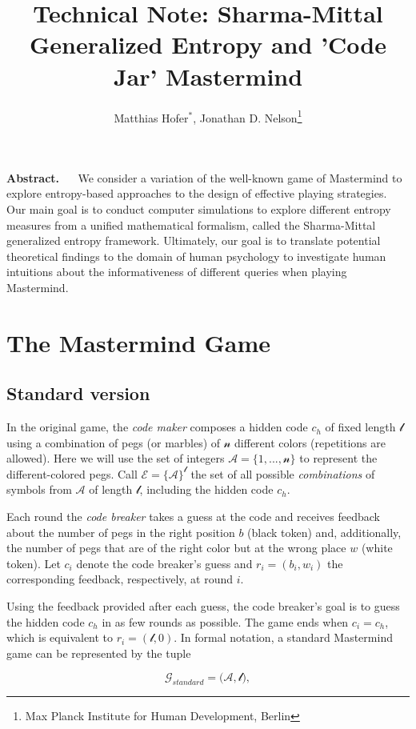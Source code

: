 \documentclass[12pt]{article}
\title{Technical Note: Sharma-Mittal Generalized Entropy and 'Code Jar' Mastermind}
\author{Matthias Hofer$^*$, Jonathan D. Nelson\footnote{Max Planck Institute for Human Development, Berlin}}
\begin{document}
\maketitle

{\footnotesize \textbf{Abstract.} $\quad$ We consider a variation of the well-known game of Mastermind to explore entropy-based approaches to the design of effective playing strategies. Our main goal is to conduct computer simulations to explore different entropy measures from a unified mathematical formalism, called the Sharma-Mittal generalized entropy framework. Ultimately, our goal is to translate potential theoretical findings to the domain of human psychology to investigate human intuitions about the informativeness of different queries when playing Mastermind.}

\tableofcontents

\pagebreak
\section{The Mastermind Game}
\subsection{Standard version}
In the original game, the \textit{code maker} composes a hidden code $c_h$ of fixed length $\mathcal{l}$ using a combination of pegs (or marbles) of $\mathcal{n}$ different colors (repetitions are allowed). Here we will use the set of integers $\mathcal{A} = \{1, ..., \mathcal{n}\}$ to represent the different-colored pegs. Call $\mathcal{E} = \{\mathcal{A}\}^\mathcal{l}$ the set of all possible \textit{combinations} of symbols from $\mathcal{A}$ of length $\mathcal{l}$, including the hidden code $c_h$. 

Each round the \textit{code breaker} takes a guess at the code and receives feedback about the number of pegs in the right position $b$ (black token) and, additionally, the number of pegs that are of the right color but at the wrong place $w$ (white token). Let $c_{i}$ denote the code breaker's guess and $r_i=(b_i,w_i)$ the corresponding feedback, respectively, at round $i$. 

Using the feedback provided after each guess, the code breaker's goal is to guess the hidden code $c_h$ in as few rounds as possible. The game ends when $c_i = c_h$, which is equivalent to $r_i=(\mathcal{l},0)$. In formal notation, a standard Mastermind game can be represented by the tuple

\[\mathcal{G}_{standard}=\Big(\mathcal{A}, \mathcal{l}\Big),\]
\end{document}
